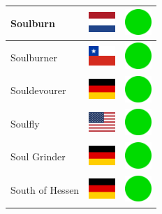\documentclass[12pt, a4paper, twoside]{report}
\begin{document}
\begin{center}
\begin{longtable}{|p{5cm}|p{2cm}|p{2cm}|}
 Soulburn                                                   & \includegraphics[width=1cm]{../img/flags/nl} &   \includegraphics[width=1cm]{../likes/y} \\ \hline
 Soulburner                                                 & \includegraphics[width=1cm]{../img/flags/cl} &   \includegraphics[width=1cm]{../likes/y} \\ \hline
 Souldevourer                                               & \includegraphics[width=1cm]{../img/flags/de} &   \includegraphics[width=1cm]{../likes/y} \\ \hline
 Soulfly                                                    & \includegraphics[width=1cm]{../img/flags/us} &   \includegraphics[width=1cm]{../likes/y} \\ \hline
 Soul Grinder                                               & \includegraphics[width=1cm]{../img/flags/de} &   \includegraphics[width=1cm]{../likes/y} \\ \hline
 South of Hessen                                            & \includegraphics[width=1cm]{../img/flags/de} &   \includegraphics[width=1cm]{../likes/y} \\ \hline

\end{longtable}
\end{center}
\end{document}
